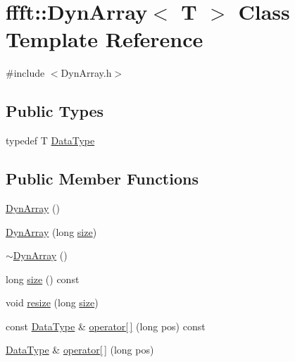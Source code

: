 \hypertarget{classffft_1_1DynArray}{}\section{ffft\+:\+:Dyn\+Array$<$ T $>$ Class Template Reference}
\label{classffft_1_1DynArray}


{\ttfamily \#include $<$Dyn\+Array.\+h$>$}

\subsection*{Public Types}
\begin{DoxyCompactItemize}
\item 
typedef T \hyperlink{classffft_1_1DynArray_aa21fa88c73e511acb18a7e778190ab02}{Data\+Type}
\end{DoxyCompactItemize}
\subsection*{Public Member Functions}
\begin{DoxyCompactItemize}
\item 
\hyperlink{classffft_1_1DynArray_a3a1bc9474a3891360464c4ad97d846ff}{Dyn\+Array} ()
\item 
\hyperlink{classffft_1_1DynArray_a26919351a30b4be36c3e3ee500a7c6a7}{Dyn\+Array} (long \hyperlink{classffft_1_1DynArray_aab5a878741b62b079c94db354357127d}{size})
\item 
\hyperlink{classffft_1_1DynArray_a0467340a0c0b5cbb47683c665e21ffd6}{$\sim$\+Dyn\+Array} ()
\item 
long \hyperlink{classffft_1_1DynArray_aab5a878741b62b079c94db354357127d}{size} () const 
\item 
void \hyperlink{classffft_1_1DynArray_a3879167bca7e35ee75596318f67e2930}{resize} (long \hyperlink{classffft_1_1DynArray_aab5a878741b62b079c94db354357127d}{size})
\item 
const \hyperlink{classffft_1_1DynArray_aa21fa88c73e511acb18a7e778190ab02}{Data\+Type} \& \hyperlink{classffft_1_1DynArray_a502aab733f04c8fed33348bce9f49e92}{operator\mbox{[}$\,$\mbox{]}} (long pos) const 
\item 
\hyperlink{classffft_1_1DynArray_aa21fa88c73e511acb18a7e778190ab02}{Data\+Type} \& \hyperlink{classffft_1_1DynArray_a79c769ea7c52d0fbbe67831380b9a89c}{operator\mbox{[}$\,$\mbox{]}} (long pos)
\end{DoxyCompactItemize}
